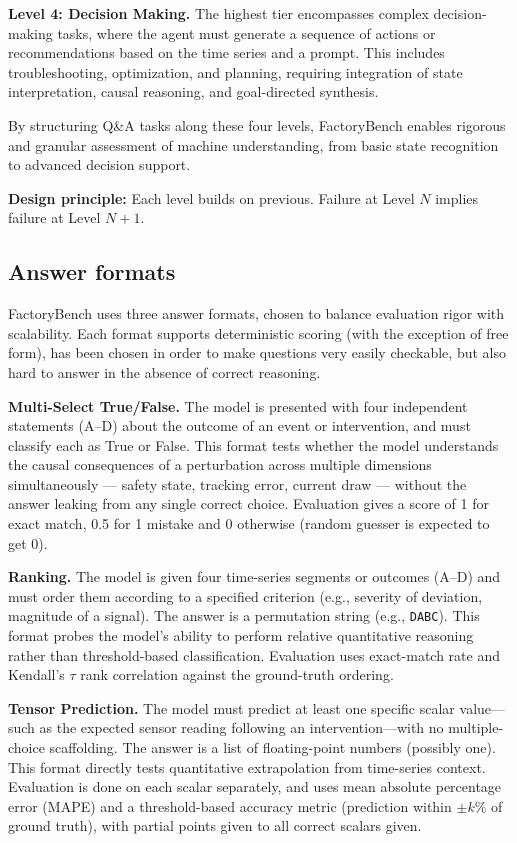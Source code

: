 \documentclass{article}
\begin{document}
\textbf{Level 4: Decision Making.} The highest tier encompasses complex decision-making tasks, where the agent must generate a sequence of actions or recommendations based on the time series and a prompt. This includes troubleshooting, optimization, and planning, requiring integration of state interpretation, causal reasoning, and goal-directed synthesis.

By structuring Q\&A tasks along these four levels, FactoryBench enables rigorous and granular assessment of machine understanding, from basic state recognition to advanced decision support.

\textbf{Design principle:} Each level builds on previous. Failure at Level $N$ implies failure at Level $N+1$.

\subsection{Answer formats}

FactoryBench uses three answer formats, chosen to balance evaluation rigor with scalability. Each format supports deterministic scoring (with the exception of free form), has been chosen in order to make questions very easily checkable, but also hard to answer in the absence of correct reasoning.

\textbf{Multi-Select True/False.} The model is presented with four independent statements (A--D) about the outcome of an event or intervention, and must classify each as True or False. This format tests whether the model understands the causal consequences of a perturbation across multiple dimensions simultaneously — safety state, tracking error, current draw — without the answer leaking from any single correct choice. Evaluation gives a score of 1 for exact match, 0.5 for 1 mistake and 0 otherwise (random guesser is expected to get 0).

\textbf{Ranking.} The model is given four time-series segments or outcomes (A--D) and must order them according to a specified criterion (e.g., severity of deviation, magnitude of a signal). The answer is a permutation string (e.g., \texttt{DABC}). This format probes the model's ability to perform relative quantitative reasoning rather than threshold-based classification. Evaluation uses exact-match rate and Kendall's $\tau$ rank correlation against the ground-truth ordering.

\textbf{Tensor Prediction.} The model must predict at least one specific scalar value---such as the expected sensor reading following an intervention---with no multiple-choice scaffolding. The answer is a list of floating-point numbers (possibly one). This format directly tests quantitative extrapolation from time-series context. Evaluation is done on each scalar separately, and uses mean absolute percentage error (MAPE) and a threshold-based accuracy metric (prediction within $\pm k\%$ of ground truth), with partial points given to all correct scalars given.
\end{document}

